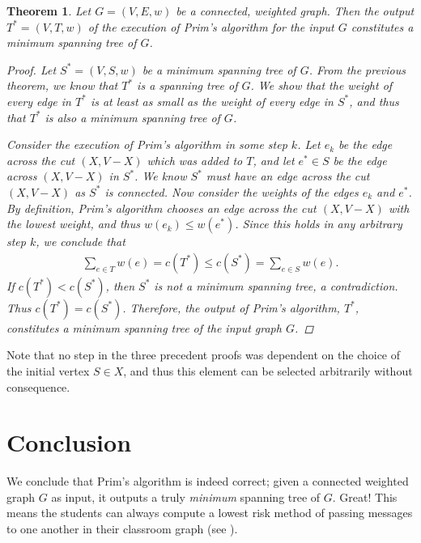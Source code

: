 \documentclass[a4paper,11pt]{report}
\theoremstyle{plain}
\newtheorem{thm}{Theorem}[section]
\theoremstyle{definition}
\begin{document}
\begin{thm}
Let $G = (V, E, w)$ be a connected, weighted graph. Then the output
$T^* = (V, T, w)$ of the execution of Prim's algorithm for the input $G$
constitutes a minimum spanning tree of $G$.

\begin{proof}
Let $S^* = (V, S, w)$ be a minimum spanning tree of $G$. From the previous
theorem, we know that $T^*$ is a spanning tree of $G$. We show that the weight
of every edge in $T^*$ is at least as small as the weight of every edge in
$S^*$, and thus that $T^*$ is also a minimum spanning tree of $G$.

Consider the execution of Prim's algorithm in some step $k$. Let $e_k$ be the
edge across the cut $(X, V - X)$ which was added to $T$, and let $e^* \in S$ be
the edge across $(X, V - X)$ in $S^*$. We know $S^*$ must have an edge across
the cut $(X, V - X)$ as $S^*$ is connected. Now consider the weights of the
edges $e_k$ and $e^*$. By definition, Prim's algorithm chooses an edge across
the cut $(X, V - X)$ with the lowest weight, and thus $w(e_k) \leq w(e^*)$.
Since this holds in any arbitrary step $k$, we conclude that
\begin{align*}
    \sum_{e \in T}{w(e)} = c(T^*) \leq c(S^*) = \sum_{e \in S}{w(e)}.
\end{align*}
If $c(T^*) < c(S^*)$, then $S^*$ is not a minimum spanning tree, a
contradiction. Thus $c(T^*) = c(S^*)$.  Therefore, the output of Prim's
algorithm, $T^*$, constitutes a minimum spanning tree of the input graph $G$.
\end{proof}
\end{thm}

Note that no step in the three precedent proofs was dependent on the choice of
the initial vertex $S \in X$, and thus this element can be selected arbitrarily
without consequence.

\section{Conclusion}

We conclude that Prim's algorithm is indeed correct; given a connected weighted
graph $G$ as input, it outputs a truly \emph{minimum} spanning tree of $G$.
Great! This means the students can always compute a lowest risk method of
passing messages to one another in their classroom graph (see
).


\end{document}
